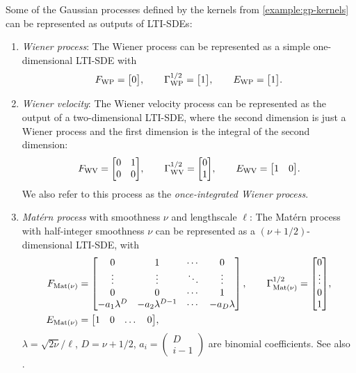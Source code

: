 \documentclass{mimosis}
\begin{document}
\begin{exmple}
\label{example:gp-kernels-as-lti-sdes}
Some of the Gaussian processes defined by the kernels from
\cref{example:gp-kernels}
can be represented
as outputs of LTI-SDEs:
\begin{enumerate}
\item \emph{Wiener process}:
The Wiener process can be represented as a simple one-dimensional LTI-SDE with
\begin{subequations}
\begin{align}
\drift_\text{WP} = \mqty[0], \qquad
\disp_\text{WP} = \mqty[1],
\qquad \outA_\text{WP} = \mqty[1].
\end{align}
\end{subequations}
\item \emph{Wiener velocity}:
The Wiener velocity process can be represented as the output of a two-dimensional LTI-SDE, where the second dimension is just a Wiener process and the first dimension is the integral of the second dimension:
\begin{subequations}
\begin{align}
\drift_\text{WV} = \mqty[0 & 1 \\ 0 & 0], \qquad
\disp_\text{WV} = \mqty[0 \\ 1],
\qquad \outA_\text{WV} = \mqty[1 & 0].
\end{align}
\end{subequations}
We also refer to this process as the \emph{once-integrated Wiener process}.
\item \emph{Matérn process} with smoothness \(\nu\) and lengthscale \(\ell\):
The Matérn process with half-integer smoothness \(\nu\) can be represented as a \((\nu+1/2)\)-dimensional LTI-SDE, with
\begin{subequations}
\begin{align}
\drift_\text{Mat($\nu$)} &= \begin{bmatrix}
0 & 1 & \cdots & 0 \\
\vdots & \vdots & \ddots & \vdots \\
0 & 0 & \cdots & 1 \\
- a_1 \lambda^D & - a_2 \lambda^{D-1} & \cdots & - a_D \lambda \\
\end{bmatrix}, \qquad
\disp_\text{Mat($\nu$)} = \mqty[0 \\ \vdots \\ 0 \\ 1], \\
\outA_\text{Mat($\nu$)} &= \mqty[1 & 0 & \dots & 0],
\end{align}
\end{subequations}
\(\lambda = \sqrt{2 \nu} / \ell\),
\(D = \nu + 1/2\),
\(a_i = \begin{pmatrix} D \\ i-1 \end{pmatrix}\) are binomial coefficients.
See also \parencite{hartikainen2010kalman}.
\end{enumerate}
\end{exmple}
\end{document}
